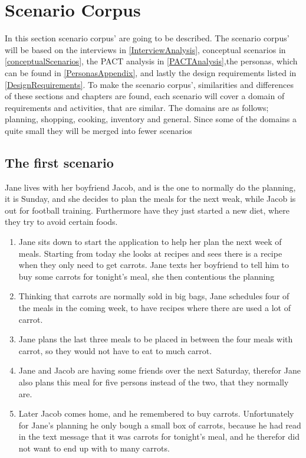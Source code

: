 \section{Scenario Corpus} \label{ScenarioCorpus}

In this section scenario corpus' are going to be described. The scenario corpus' will be based on the interviews in \cref{InterviewAnalysis}, conceptual scenarios in \cref{conceptualScenarios}, the PACT analysis in \cref{PACTAnalysis},the personas, which can be found in \cref{PersonasAppendix}, and lastly the design requirements listed in \cref{DesignRequirements}. To make the scenario corpus', similarities and differences of these sections and chapters are found, each scenario will cover a domain of requirements and activities, that are similar. The domains are as follows; planning, shopping, cooking, inventory and general. Since some of the domains a quite small they will be merged into fewer scenarios

\subsection{The first scenario}
Jane lives with her boyfriend Jacob, and is the one to normally do the planning, it is Sunday, and she decides to plan the meals for the next weak, while Jacob is out for football training. Furthermore have they just started a new diet, where they try to avoid certain foods.
\begin{enumerate}
  \item Jane sits down to start the application to help her plan the next week of meals. Starting from today she looks at recipes and sees there is a recipe when they only need to get carrots. Jane texts her boyfriend to tell him to buy some carrots for tonight's meal, she then contentious the planning
  \item Thinking that carrots are normally sold in big bags, Jane schedules four of the meals in the coming week, to have recipes where there are used a lot of carrot.
  \item Jane plans the last three meals to be placed in between the four meals with carrot, so they would not have to eat to much carrot.
  \item Jane and Jacob are having some friends over the next Saturday, therefor Jane also plans this meal for five persons instead of the two, that they normally are.
  \item Later Jacob comes home, and he remembered to buy carrots. Unfortunately for Jane's planning he only bough a small box of carrots, because he had read in the text message that it was carrots for tonight's meal, and he therefor did not want to end up with to many carrots.
\end{enumerate}


